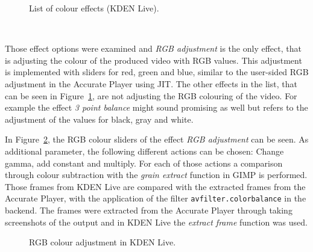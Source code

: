 \documentclass[../MasterThesis.tex]{subfiles}
\begin{document}
\begin{minipage}{0.48\textwidth}
	\vspace*{-0.3em}
	\begin{figure}[H]
	\begin{center}
		\caption[List of colour effects in KDEN Live.]{List of colour effects (KDEN Live).}
		\label{figure:kdenlive_effekte}
	\end{center}
	\end{figure}
	\vfill
	
	
\end{minipage}\begin{minipage}{0.04\textwidth}
	\ 
\end{minipage}\begin{minipage}{0.48\textwidth}
%
%
Those effect options were examined and \textit{RGB adjustment} is the only effect, that is adjusting the colour of the produced video with RGB values. This adjustment is implemented with sliders for red, green and blue, similar to the user-sided RGB adjustment in the Accurate Player using JIT. The other effects in the list, that can be seen in Figure~\ref{figure:kdenlive_effekte}, are not adjusting the RGB colouring of the video.
For example the effect \textit{3 point balance} might sound promising as well but refers to the adjustment of the values for black, gray and white.

\end{minipage}

\vspace*{0.6em}

In Figure~\ref{figure:kdenlive_rgb}, the RGB colour sliders of the effect \textit{RGB adjustment} can be seen. As additional parameter, the following different actions can be chosen: Change gamma, add constant and multiply. For each of those actions a comparison through colour subtraction with the \textit{grain extract} function in GIMP is performed. Those frames from KDEN Live are compared with the extracted frames from the Accurate Player, with the application of the filter \texttt{avfilter.colorbalance} in the backend.
The frames were extracted from the Accurate Player through taking screenshots of the output and in KDEN Live the \textit{extract frame} function was used.


\begin{figure}[H]
	\begin{center}
		\caption[RGB colour adjustment in KDEN Live.]{RGB colour adjustment in KDEN Live.}
		\label{figure:kdenlive_rgb}
	\end{center}
\end{figure}
\end{document}
